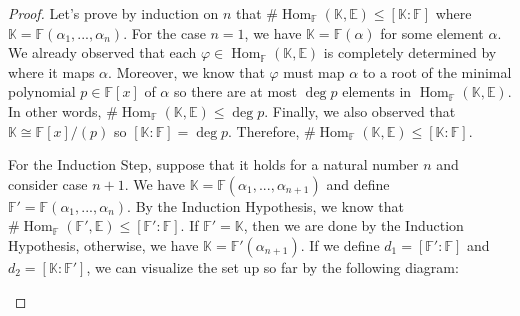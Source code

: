 \documentclass{article}
\newcommand{\F}{\mathbb{F}}
\newcommand{\E}{\mathbb{E}}
\newcommand{\K}{\mathbb{K}}
\DeclareMathOperator{\Hom}{\text{Hom}}
\newcommand{\isomorphic}{\cong}
\begin{document}
\begin{proof}
    Let's prove by induction on $n$ that $\# \Hom_{\F}(\K, \E) \leq [\K : \F]$ where $\K = \F(\alpha_1, ..., \alpha_n)$. For the case $n=1$, we have $\K = \F(\alpha)$ for some element $\alpha$. We already observed that each $\varphi \in \Hom_{\F}(\K, \E)$ is completely determined by where it maps $\alpha$. Moreover, we know that $\varphi$ must map $\alpha$ to a root of the minimal polynomial $p \in \F[x]$ of $\alpha$ so there are at most $\deg p$ elements in $\Hom_{\F}(\K, \E)$. In other words, $\#\Hom_{\F}(\K, \E) \leq \deg p$. Finally, we also observed that $\K \isomorphic \F[x] / (p)$ so $[\K : \F] = \deg p$. Therefore, $\# \Hom_{\F}(\K, \E) \leq [\K : \F]$. 
    
    For the Induction Step, suppose that it holds for a natural number $n$ and consider case $n+1$. We have $\K = \F(\alpha_1, ..., \alpha_{n+1})$ and define $\F' = \F(\alpha_1, ..., \alpha_n)$. By the Induction Hypothesis, we know that $\# \Hom_{\F}(\F', \E) \leq [\F' : \F]$. If $\F' = \K$, then we are done by the Induction Hypothesis, otherwise, we have $\K = \F'(\alpha_{n+1})$. If we define $d_1 = [\F' : \F]$ and $d_2 = [\K : \F']$, we can visualize the set up so far by the following diagram:
    \begin{center}
\end{center}
\end{proof}
\end{document}
